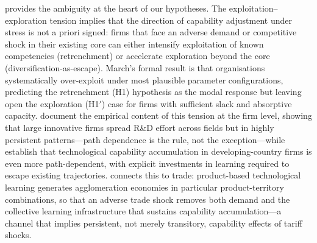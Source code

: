 \citet{march1991} provides the ambiguity at the heart of our hypotheses. The
exploitation--exploration tension implies that the direction of capability adjustment
under stress is not a priori signed: firms that face an adverse demand or competitive
shock in their existing core can either intensify exploitation of known competencies
(retrenchment) or accelerate exploration beyond the core (diversification-as-escape).
March's formal result is that organisations systematically over-exploit under most
plausible parameter configurations, predicting the retrenchment (H1) hypothesis as
the modal response but leaving open the exploration (H1$'$) case for firms with
sufficient slack and absorptive capacity. \citet{patel1997} document the empirical
content of this tension at the firm level, showing that large innovative firms spread
R\&D effort across fields but in highly persistent patterns---path dependence is the
rule, not the exception---while \citet{bell1993} establish that technological
capability accumulation in developing-country firms is even more path-dependent,
with explicit investments in learning required to escape existing trajectories.
\citet{storper1992} connects this to trade: product-based technological learning
generates agglomeration economies in particular product-territory combinations, so
that an adverse trade shock removes both demand and the collective learning
infrastructure that sustains capability accumulation---a channel that implies
persistent, not merely transitory, capability effects of tariff shocks.


